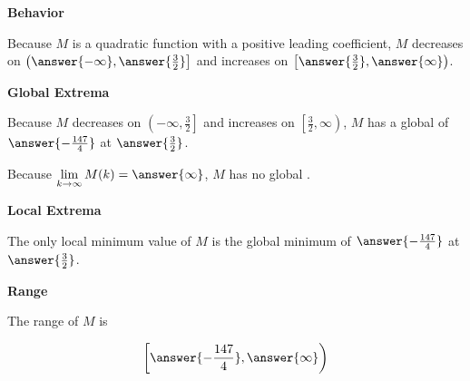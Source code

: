 \documentclass{ximera}
\begin{document}
\begin{exercise}
\begin{question}
\end{question}




\begin{question}  \textbf{\textcolor{blue!55!black}{Behavior}}



Because $M$ is a quadratic function with a positive leading coefficient, $M$ decreases on $\left( \answer{-\infty}, \answer{\frac{3}{2}} \right]$ and increases on $\left[ \answer{\frac{3}{2}}, \answer{\infty} \right)$. 

\end{question}









\begin{question}  \textbf{\textcolor{blue!55!black}{Global Extrema}}

Because $M$ decreases on $\left( -\infty, \frac{3}{2} \right]$ and increases on $\left[ \frac{3}{2}, \infty \right)$, $M$ has a global   of $\answer{-\frac{147}{4}}$ at $\answer{\frac{3}{2}}$.



Because $\lim\limits_{k \to \infty} M(k) = \answer{\infty}$, $M$ has no global .

\end{question}












\begin{question}  \textbf{\textcolor{blue!55!black}{Local Extrema}}

The only local minimum value of $M$ is the global minimum of $\answer{-\frac{147}{4}}$ at $\answer{\frac{3}{2}}$.

\end{question}







\begin{question}  \textbf{\textcolor{blue!55!black}{Range}}

The range of $M$ is

\[
\left[ \answer{-\frac{147}{4}},  \answer{\infty} \right)
\]

\end{question}


\end{exercise}
\end{document}
